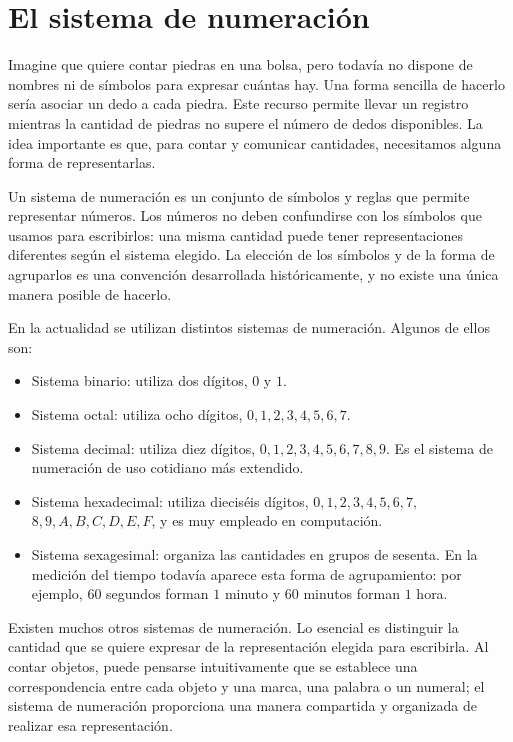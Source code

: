 \section{El sistema de numeración}

Imagine que quiere contar piedras en una bolsa, pero todavía no dispone de nombres ni de símbolos para expresar cuántas hay. Una forma sencilla de hacerlo sería asociar un dedo a cada piedra. Este recurso permite llevar un registro mientras la cantidad de piedras no supere el número de dedos disponibles. La idea importante es que, para contar y comunicar cantidades, necesitamos alguna forma de representarlas.

Un sistema de numeración es un conjunto de símbolos y reglas que permite representar números. Los números no deben confundirse con los símbolos que usamos para escribirlos: una misma cantidad puede tener representaciones diferentes según el sistema elegido. La elección de los símbolos y de la forma de agruparlos es una convención desarrollada históricamente, y no existe una única manera posible de hacerlo.

En la actualidad se utilizan distintos sistemas de numeración. Algunos de ellos son:
\begin{itemize}
  \item Sistema binario: utiliza dos dígitos, \(0\) y \(1\).
  \item Sistema octal: utiliza ocho dígitos, \(0,1,2,3,4,5,6,7\).
  \item Sistema decimal: utiliza diez dígitos, \(0,1,2,3,4,5,6,7,8,9\). Es el sistema de numeración de uso cotidiano más extendido.
  \item Sistema hexadecimal: utiliza dieciséis dígitos, \(0,1,2,3,4,5,6,7,\) \(8,9,A,B,C,D,E,F\), y es muy empleado en computación.
  \item Sistema sexagesimal: organiza las cantidades en grupos de sesenta. En la medición del tiempo todavía aparece esta forma de agrupamiento: por ejemplo, \(60\) segundos forman \(1\) minuto y \(60\) minutos forman \(1\) hora.
\end{itemize}

Existen muchos otros sistemas de numeración. Lo esencial es distinguir la cantidad que se quiere expresar de la representación elegida para escribirla. Al contar objetos, puede pensarse intuitivamente que se establece una correspondencia entre cada objeto y una marca, una palabra o un numeral; el sistema de numeración proporciona una manera compartida y organizada de realizar esa representación.


